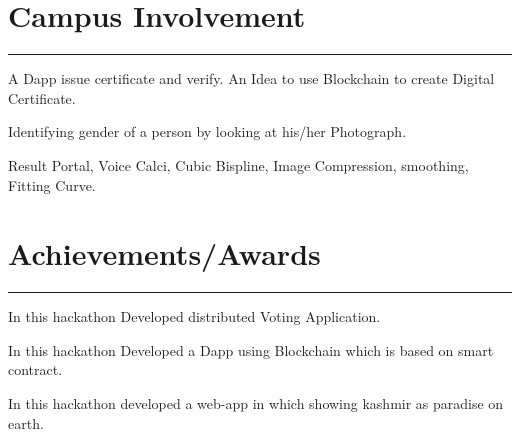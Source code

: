 \documentclass[]{sahana}
\begin{document}
\begin{minipage}[t]{0.66\textwidth}
\section{Campus Involvement}
\noindent\rule{12.5cm}{0.4pt}
 
\noindent
\hspace{5em}%
\begin{minipage}{0.85\textwidth\vspace{5pt}}
A Dapp issue certificate and verify. An Idea to use Blockchain to create Digital Certificate.
\end{minipage}
 
\noindent
\hspace{5em}%
\begin{minipage}{0.85\textwidth\vspace{5pt}}
Identifying gender of a person by looking at his/her Photograph.
\end{minipage}
 
\noindent
\hspace{5em}%
\begin{minipage}{0.85\textwidth\vspace{5pt}}
Result Portal, Voice Calci, Cubic Bispline, Image Compression, smoothing, Fitting Curve.
\end{minipage}
\section{Achievements/Awards} 
\noindent\rule{12.5cm}{0.4pt}
 
\noindent
\hspace{5em}%
\begin{minipage}{0.85\textwidth\vspace{2pt}}
In this hackathon Developed distributed Voting Application.
\end{minipage}
 
\noindent
\hspace{5em}%
\begin{minipage}{0.85\textwidth\vspace{2pt}}
In this hackathon Developed a Dapp using Blockchain which is based on smart contract.
\end{minipage}
 
\noindent
\hspace{5em}%
\begin{minipage}{0.85\textwidth\vspace{2pt}}
In this hackathon developed a web-app in which showing kashmir as paradise on earth.
\end{minipage}

\end{minipage} 
\end{document}
